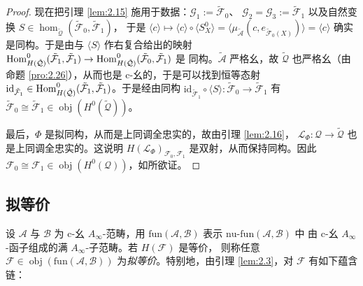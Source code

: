 \begin{proof}
现在把引理 \ref{lem:2.15} 施用于数据：$\mathcal G_1:=\tilde{\mathcal F}_0$、
$\mathcal G_2=\mathcal G_3:=\tilde{\mathcal F}_1$ 以及自然变换
$S\in\hom_{\tilde{\mathcal Q}}(\tilde{\mathcal F}_0,\tilde{\mathcal F}_1)$，
于是 $\langle c\rangle\mapsto\langle c\rangle\circ\langle S^0_X\rangle=
\langle\mu_{\tilde{\mathcal A}}(c,e_{\tilde{\mathcal F}_0(X)})\rangle=\langle c
\rangle$ 确实是同构。于是由与 $\langle S\rangle$ 作右复合给出的映射
$\operatorname{Hom}^0_{H(\tilde{\mathcal Q})}(\tilde{\mathcal F}_1,\tilde{\mathcal F}_1)\to
\operatorname{Hom}^0_{H(\tilde{\mathcal Q})}(\tilde{\mathcal F}_0,\tilde{\mathcal F}_1)$ 是
同构。$\tilde{\mathcal A}$ 严格幺，故 $\tilde{\mathcal Q}$ 也严格幺（由命题 \ref{pro:2.26}），从而也是 c-幺的，于是可以找到恒等态射
$\mathrm{id}_{\tilde{\mathcal F}_1}\in\operatorname{Hom}^0_{H(\tilde{\mathcal Q})}
(\tilde{\mathcal F}_1,\tilde{\mathcal F}_1)$。于是经由同构
$\mathrm{id}_{\tilde{\mathcal F}_1}\circ\langle S\rangle:\tilde{\mathcal F}_0\to
\tilde{\mathcal F}_1$ 有 $\tilde{\mathcal F}_0\cong\tilde{\mathcal F}_1\in
\operatorname{obj}(H^0(\tilde{\mathcal Q}))$。

最后，$\Phi$ 是拟同构，从而是上同调全忠实的，故由引理 \ref{lem:2.16}，
$\mathcal L_{\Phi}:\mathcal Q\to\tilde{\mathcal Q}$ 也是上同调全忠实的。这说明
$H(\mathcal L_{\Phi})_{\mathcal F_0,\mathcal F_1}$ 是双射，从而保持同构。因此
$\mathcal F_0\cong\mathcal F_1\in\operatorname{obj}(H^0(\mathcal Q))$，如所欲证。
\end{proof}

\subsection{拟等价}\label{sec:2.8}

\begin{Def}\label{def:2.29}
设 $\mathcal A$ 与 $\mathcal B$ 为 c-幺 $A_\infty$-范畴，用 $\mathrm{fun}
(\mathcal A,\mathcal B)$ 表示 $\mathrm{nu\text{-}fun}(\mathcal A,\mathcal B)$ 中
由 c-幺 $A_\infty$-函子组成的满 $A_\infty$-子范畴。若 $H(\mathcal F)$ 是等价，
则称任意 $\mathcal F\in\operatorname{obj}(\mathrm{fun}(\mathcal A,\mathcal B))$
为\emph{拟等价}。特别地，由引理 \ref{lem:2.3}，对 $\mathcal F$ 有如下蕴含链：
\begin{center}
\end{center}
\end{Def}

